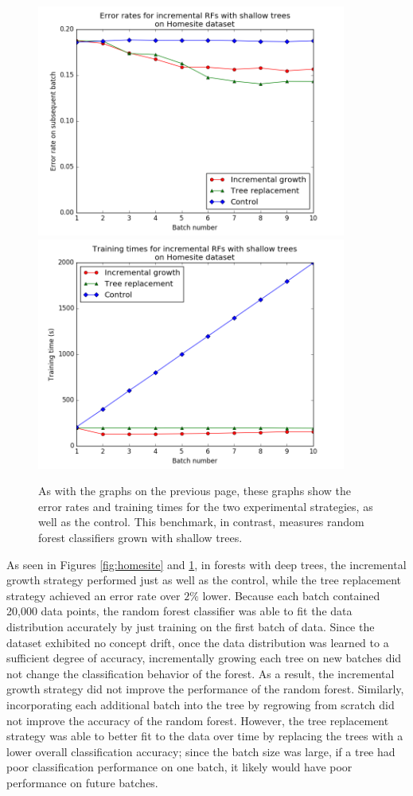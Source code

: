 \begin{figure}
  \centering
  \includegraphics[width=4.0in]{g2}\\
  \includegraphics[width=4.0in]{g2_1}
  \caption{As with the graphs on the previous page, these graphs show the error
  rates and training times for the two experimental strategies, as well as the
  control. This benchmark, in contrast, measures random forest classifiers grown
  with shallow trees.}
  \label{fig:homesite2}
\end{figure}

As seen in Figures \ref{fig:homesite} and \ref{fig:homesite2}, in forests with
deep trees, the incremental growth strategy performed just as well as the
control, while the tree replacement strategy achieved an error rate over $2\%$
lower.  Because each batch contained 20,000 data points, the random forest
classifier was able to fit the data distribution accurately by just training on
the first batch of data. Since the dataset exhibited no concept drift, once the
data distribution was learned to a sufficient degree of accuracy, incrementally
growing each tree on new batches did not change the classification behavior of
the forest. As a result, the incremental growth strategy did not improve the
performance of the random forest. Similarly, incorporating each additional
batch into the tree by regrowing from scratch did not improve the accuracy of
the random forest.  However, the tree replacement strategy was able to better
fit to the data over time by replacing the trees with a lower overall
classification accuracy; since the batch size was large, if a tree had poor
classification performance on one batch, it likely would have poor performance
on future batches.

